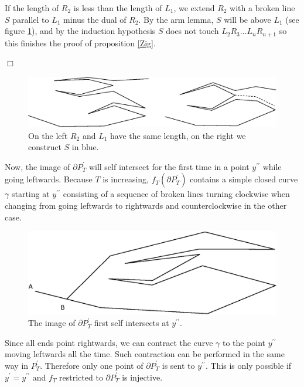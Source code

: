 \documentclass[openright, 12pt]{article}
\begin{document}
If the length of $R_2$ is less than the length of $L_1$, we extend $R_2 $ with a broken line $S$ parallel to $L_1$ minus the dual of $R_2$. By the arm lemma, $S$ will be above $L_1$ (see figure \ref{S}), and by the induction hypothesis $S$ does not touch $L_2R_3 \ldots L_nR_{n+1}$ so this finishes the proof of proposition \ref{Zig}.

\hfill $\Box$



\begin{figure}[h]
\centering
\includegraphics[scale=0.7]{S.eps}
\caption{On the left $R_2$ and $L_1$ have the same length, on the right we construct $S$ in blue.} \label{S}
\end{figure}




Now, the image of $\partial  P^{\prime}_T$ will self intersect for the first time in a point $y^{\prime\prime}$ while going leftwards. Because $T$ is increasing, $f_T(\partial P_T^{\prime})$ contains a simple closed curve $\gamma$ starting at $y^{\prime \prime}$ consisting of a sequence of broken lines turning clockwise when changing from going leftwards to rightwards and counterclockwise in the other case.




\begin{figure}[h]
\centering
{}
\includegraphics[scale=0.7]{Prime.eps}
\caption{The image of $\partial P^{\prime}_T$ first self intersects at $y^{\prime \prime}$.}
\end{figure}


Since all ends point rightwards, we can contract the curve $\gamma$ to the point  $y^{\prime \prime}$ moving leftwards all the time. Such contraction can be performed in the same way in $P^{\prime}_T$. Therefore only one point of $\partial P^{\prime } _T$ is sent to $y^{\prime \prime}$. This is only possible if $y^{\prime} = y^{\prime \prime}$ and $f_T$ restricted to $\partial P^{\prime}_T$ is injective.
\end{document}
